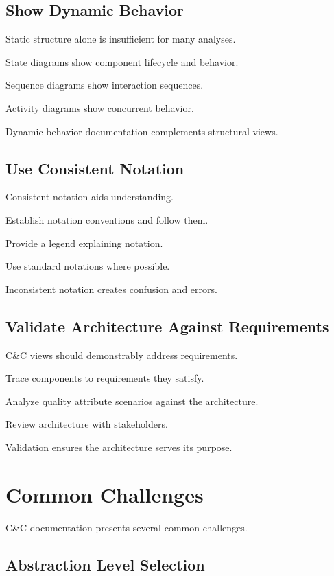 \documentclass[11pt]{article}
\begin{document}
\subsection{Show Dynamic Behavior}

Static structure alone is insufficient for many analyses.

State diagrams show component lifecycle and behavior.

Sequence diagrams show interaction sequences.

Activity diagrams show concurrent behavior.

Dynamic behavior documentation complements structural views.

\subsection{Use Consistent Notation}

Consistent notation aids understanding.

Establish notation conventions and follow them.

Provide a legend explaining notation.

Use standard notations where possible.

Inconsistent notation creates confusion and errors.

\subsection{Validate Architecture Against Requirements}

C\&C views should demonstrably address requirements.

Trace components to requirements they satisfy.

Analyze quality attribute scenarios against the architecture.

Review architecture with stakeholders.

Validation ensures the architecture serves its purpose.

\section{Common Challenges}

C\&C documentation presents several common challenges.

\subsection{Abstraction Level Selection}
\end{document}
